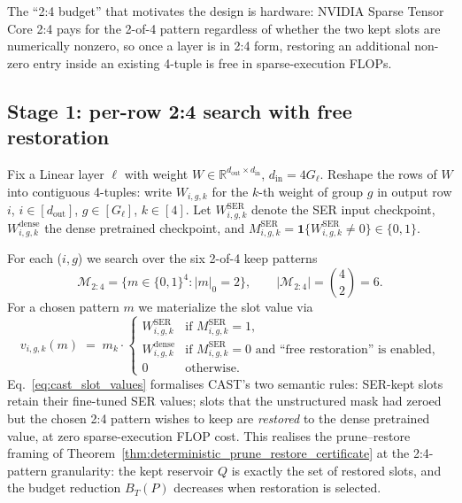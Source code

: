 \documentclass[11pt]{article}
\theoremstyle{plain}
\theoremstyle{definition}
\theoremstyle{remark}
\newcommand{\1}{\mathbf{1}}
\begin{document}
The ``2:4 budget'' that motivates the design is hardware: NVIDIA Sparse Tensor Core 2:4 \cite{mishra2021accelerating} pays for the 2-of-4 pattern regardless of whether the two kept slots are numerically nonzero, so once a layer is in 2:4 form, restoring an additional non-zero entry inside an existing 4-tuple is free in sparse-execution FLOPs.

\subsection{Stage 1: per-row 2:4 search with free restoration}
\label{subsec:cast_stage1}

Fix a Linear layer \(\ell\) with weight \(W\in\mathbb R^{d_{\mathrm{out}}\times d_{\mathrm{in}}}\), \(d_{\mathrm{in}}=4G_\ell\).  Reshape the rows of \(W\) into contiguous 4-tuples: write \(W_{i,g,k}\) for the \(k\)-th weight of group \(g\) in output row \(i\), \(i\in[d_{\mathrm{out}}]\), \(g\in[G_\ell]\), \(k\in[4]\).  Let \(W^{\mathrm{SER}}_{i,g,k}\) denote the SER input checkpoint, \(W^{\mathrm{dense}}_{i,g,k}\) the dense pretrained checkpoint, and \(M^{\mathrm{SER}}_{i,g,k}=\mathbf 1\{W^{\mathrm{SER}}_{i,g,k}\ne 0\}\in\{0,1\}\).

For each (\(i,g\)) we search over the six 2-of-4 keep patterns
\[
\mathcal M_{2:4}=\bigl\{m\in\{0,1\}^4 : |m|_0=2\bigr\},
\qquad |\mathcal M_{2:4}|=\binom{4}{2}=6.
\]
For a chosen pattern \(m\) we materialize the slot value via
\begin{equation}
\label{eq:cast_slot_values}
v_{i,g,k}(m) \;=\; m_k\cdot
\begin{cases}
W^{\mathrm{SER}}_{i,g,k} & \text{if } M^{\mathrm{SER}}_{i,g,k}=1,\\
W^{\mathrm{dense}}_{i,g,k} & \text{if } M^{\mathrm{SER}}_{i,g,k}=0\text{ and ``free restoration'' is enabled,}\\
0 & \text{otherwise.}
\end{cases}
\end{equation}
Eq.~\eqref{eq:cast_slot_values} formalises CAST's two semantic rules: SER-kept slots retain their fine-tuned SER values; slots that the unstructured mask had zeroed but the chosen 2:4 pattern wishes to keep are \emph{restored} to the dense pretrained value, at zero sparse-execution FLOP cost.  This realises the prune--restore framing of Theorem~\ref{thm:deterministic_prune_restore_certificate} at the 2:4-pattern granularity: the kept reservoir \(Q\) is exactly the set of restored slots, and the budget reduction \(B_T(P)\) decreases when restoration is selected.
\end{document}
